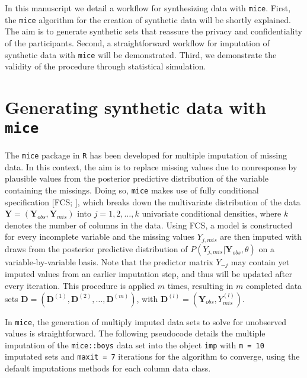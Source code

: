 \documentclass[psych,article,submit,moreauthors,pdftex]{mdpi}
\begin{document}
In this manuscript we detail a workflow for synthesizing data with
\texttt{mice}. First, the \texttt{mice} algorithm for the creation of
synthetic data will be shortly explained. The aim is to generate
synthetic sets that reassure the privacy and confidentiality of the
participants. Second, a straightforward workflow for imputation of
synthetic data with \texttt{mice} will be demonstrated. Third, we
demonstrate the validity of the procedure through statistical
simulation.

\hypertarget{generating-synthetic-data-with-mice}{%
\section{\texorpdfstring{Generating synthetic data with
\texttt{mice}}{Generating synthetic data with mice}}\label{generating-synthetic-data-with-mice}}

The \texttt{mice} package \citep{mice} in \texttt{R} \citep{Rproject}
has been developed for multiple imputation of missing data. In this
context, the aim is to replace missing values due to nonresponse by
plausible values from the posterior predictive distribution of the
variable containing the missings. Doing so, \texttt{mice} makes use of
fully conditional specification {[}FCS; \citet{vanbuuren_fully_2006}{]},
which breaks down the multivariate distribution of the data
\(\textbf{Y} = (\textbf{Y}_{obs}, \textbf{Y}_{mis})\) into
\(j = 1, 2, \dots, k\) univariate conditional densities, where \(k\)
denotes the number of columns in the data. Using FCS, a model is
constructed for every incomplete variable and the missing values
\(Y_{j, mis}\) are then imputed with draws from the posterior predictive
distribution of \(P(Y_{j, mis} | \textbf{Y}_{obs}, \theta)\) on a
variable-by-variable basis. Note that the predictor matrix \(Y_{-j}\)
may contain yet imputed values from an earlier imputation step, and thus
will be updated after every iteration. This procedure is applied \(m\)
times, resulting in \(m\) completed data sets
\(\textbf{D} = (\textbf{D}^{(1)}, \textbf{D}^{(2)}, \dots, \textbf{D}^{(m)})\),
with \(\textbf{D}^{(l)} = (\textbf{Y}_{obs}, Y^{(l)}_{mis})\).

In \texttt{mice}, the generation of multiply imputed data sets to solve
for unobserved values is straightforward. The following pseudocode
details the multiple imputation of the \texttt{mice::boys} data set
\citep{fredriks_boys_2000} into the object \texttt{imp} with
\texttt{m\ =\ 10} imputated sets and \texttt{maxit\ =\ 7} iterations for
the algorithm to converge, using the default imputations methods for
each column data class.
\end{document}
